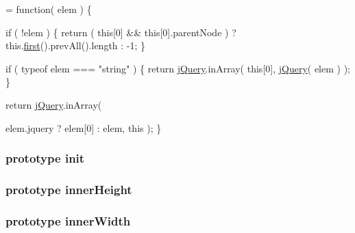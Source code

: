 \begin{DoxyCode}
= \textcolor{keyword}{function}( elem ) \{



        
        \textcolor{keywordflow}{if} ( !elem ) \{
            \textcolor{keywordflow}{return} ( \textcolor{keyword}{this}[0] && \textcolor{keyword}{this}[0].parentNode ) ? this.\hyperlink{jquery-1_810_82-vsdoc_8js_a436adcac6bdff190fbce85670078e885}{first}().prevAll().length : -1;
        \}

        
        \textcolor{keywordflow}{if} ( typeof elem === \textcolor{stringliteral}{"string"} ) \{
            \textcolor{keywordflow}{return} \hyperlink{jquery-1_810_82-vsdoc_8js_add5237586d970a38a81f990e8eb28c6c}{jQuery}.inArray( \textcolor{keyword}{this}[0], \hyperlink{jquery-1_810_82-vsdoc_8js_add5237586d970a38a81f990e8eb28c6c}{jQuery}( elem ) );
        \}

        
        \textcolor{keywordflow}{return} \hyperlink{jquery-1_810_82-vsdoc_8js_add5237586d970a38a81f990e8eb28c6c}{jQuery}.inArray(
            
            elem.jquery ? elem[0] : elem, \textcolor{keyword}{this} );
    \}
\end{DoxyCode}
\hypertarget{jquery-1_810_82-vsdoc_8js_a4d7eae8a73366d18982efeb109237a74}{
\subsubsection[{init}]{ {\bf prototype} init}}\label{jquery-1_810_82-vsdoc_8js_a4d7eae8a73366d18982efeb109237a74}
\hypertarget{jquery-1_810_82-vsdoc_8js_a74b254137855e091d242946fbbe2fbe8}{
\subsubsection[{inner\-Height}]{ {\bf prototype} inner\-Height}}\label{jquery-1_810_82-vsdoc_8js_a74b254137855e091d242946fbbe2fbe8}
\hypertarget{jquery-1_810_82-vsdoc_8js_a903029bceb8e6512b7e550f1ac0efbd2}{
\subsubsection[{inner\-Width}]{ {\bf prototype} inner\-Width}}\label{jquery-1_810_82-vsdoc_8js_a903029bceb8e6512b7e550f1ac0efbd2}
